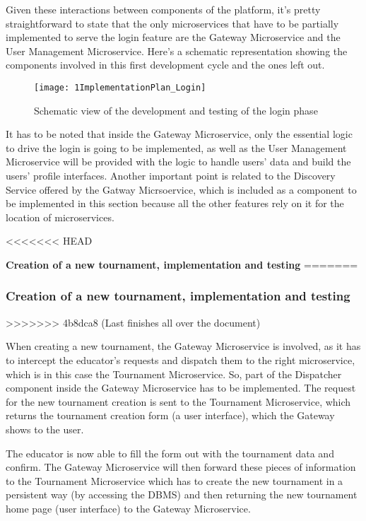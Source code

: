 Given these interactions between components of the \app platform, it's pretty straightforward to state that the only microservices that have to be partially implemented to serve the login feature are the Gateway Microservice and the User Management Microservice. 
Here's a schematic representation showing the components involved in this first development cycle and the ones left out.

\begin{figure}[h]
        \centering
	\texttt{[image: 1ImplementationPlan\_Login]}
        \caption{Schematic view of the development and testing of the login phase}
\end{figure}


It has to be noted that inside the Gateway Microservice, only the essential logic to drive the login is going to be implemented, as well as the User Management Microservice will be provided with the logic to handle users' data and build the users' profile interfaces.
Another important point is related to the Discovery Service offered by the Gatway Micrsoervice, which is included as a component to be implemented in this section because all the other features rely on it for the location of microservices.
\newpage

<<<<<<< HEAD

\vspace{0.7cm}

\textbf{Creation of a new tournament, implementation and testing}
=======
\subsubsection*{Creation of a new tournament, implementation and testing}
>>>>>>> 4b8dca8 (Last finishes all over the document)

When creating a new tournament, the Gateway Microservice is involved, as it has to intercept the educator's requests and dispatch them to the right microservice, which is in this case the Tournament Microservice. So, part of the Dispatcher component inside the Gateway Microservice has to be implemented. 
The request for the new tournament creation is sent to the Tournament Microservice, which returns the tournament creation form (a user interface), which the Gateway shows to the user.

The educator is now able to fill the form out with the tournament data and confirm. The Gateway Microservice will then forward these pieces of information to the Tournament Microservice which has to create the new tournament in a persistent way (by accessing the DBMS) and then returning the new tournament home page (user interface) to the Gateway Microservice.

